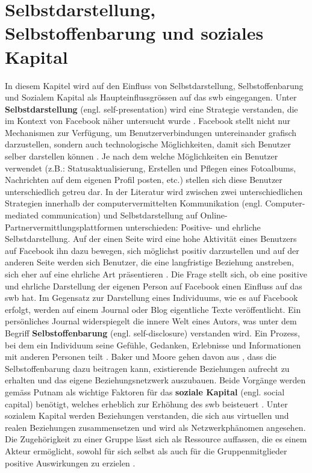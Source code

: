 \section{Selbstdarstellung, Selbstoffenbarung und soziales Kapital}\label{sub.selfp}
In diesem Kapitel wird auf den Einfluss von Selbstdarstellung, Selbstoffenbarung und Sozialem Kapital als Haupteinflussgrössen auf das \gls{swb} eingegangen. \newline
Unter \textbf{Selbstdarstellung} (engl. self-presentation) wird eine Strategie verstanden, die im Kontext von Facebook näher untersucht wurde \cite{Kim:2011}. Facebook stellt nicht nur Mechanismen zur Verfügung, um Benutzerverbindungen untereinander grafisch darzustellen, sondern auch technologische Möglichkeiten, damit sich Benutzer selber darstellen können \cite{Boyd:2007}. Je nach dem welche Möglichkeiten ein Benutzer verwendet (z.B.: Statusaktualisierung, Erstellen und Pflegen eines Fotoalbums, Nachrichten auf dem eigenen Profil posten, etc.) stellen sich diese Benutzer unterschiedlich getreu dar. In der Literatur wird zwischen zwei unterschiedlichen Strategien innerhalb der computervermittelten Kommunikation (engl. Computer-mediated communication) \cite{Tidwell:2002} und Selbstdarstellung auf Online-Partnervermittlungsplattformen \cite{Gibbs:2006}  unterschieden: Positive- und ehrliche Selbstdarstellung. Auf der einen Seite wird eine hohe Aktivität eines Benutzers auf Facebook ihn dazu bewegen, sich möglichst positiv darzustellen \cite{Kimmerle:2008} und auf der anderen Seite werden sich Benutzer, die eine langfristige Beziehung anstreben, sich eher auf eine ehrliche Art präsentieren \cite{Gibbs:2006}. Die Frage stellt sich, ob eine positive und ehrliche Darstellung der eigenen Person auf Facebook einen Einfluss auf das \gls{swb} hat.\newline
Im Gegensatz zur Darstellung eines Individuums, wie es auf Facebook erfolgt, werden auf einem Journal oder Blog eigentliche Texte veröffentlicht. Ein persönliches Journal widerspiegelt die innere Welt eines Autors, was unter dem Begriff \textbf{Selbstoffenbarung} (engl. self-disclosure) verstanden wird. Ein Prozess, bei dem ein Individuum seine Gefühle, Gedanken, Erlebnisse und Informationen mit anderen Personen teilt \cite{Derlega:1993}. Baker und Moore gehen davon aus \cite{Baker:2008}, dass die Selbstoffenbarung dazu beitragen kann, existierende Beziehungen aufrecht zu erhalten und das eigene Beziehungsnetzwerk auszubauen. Beide Vorgänge werden gemäss Putnam \cite{Putnam:2000} als wichtige Faktoren für das \textbf{soziale Kapital} (engl. social capital) benötigt, welches erheblich zur Erhöhung des \gls{swb} beisteuert \cite{Sirgy:2006}. Unter sozialem Kapital werden Beziehungen verstanden, die sich aus virtuellen und realen Beziehungen zusammensetzen \cite{Ellison:2007} und wird als Netzwerkphänomen angesehen. Die Zugehörigkeit zu einer Gruppe lässt sich als Ressource auffassen, die es einem Akteur ermöglicht, sowohl für sich selbst als auch für die Gruppenmitglieder positive Auswirkungen zu erzielen \cite{Bourdieu:1983}.\newline
